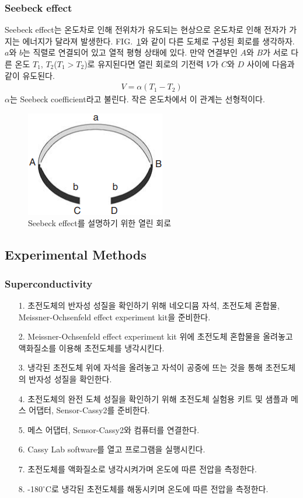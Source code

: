 \documentclass[aps,reprint,superscriptaddress,10pt]{revtex4-2}
\begin{document}
\subsubsection{Seebeck effect}
Seebeck effect는 온도차로 인해 전위차가 유도되는 현상으로 온도차로 인해 전자가 가지는
에너지가 달라져 발생한다. FIG.~\ref{fig:see}와 같이 다른 도체로 구성된 회로를 생각하자.
$a$와 $b$는 직렬로 연결되어 있고 열적 평형 상태에 있다. 만약 연결부인 $A$와 $B$가 서로
다른 온도 $T_1$, $T_2$($T_1>T_2$)로 유지된다면 열린 회로의 기전력 $V$가 $C$와 $D$ 사이에 다음과
같이 유도된다.
\begin{align}
  V = \alpha(T_1-T_2)
\end{align}
$\alpha$는 Seebeck coefficient라고 불린다. 작은 온도차에서 이 관계는 선형적이다.
\begin{figure}[htbp]
  \centering
  \includegraphics[scale = 0.6]{seebeck.png}
  \caption{Seebeck effect를 설명하기 위한 열린 회로}
  \label{fig:see}
\end{figure}








\subsection{Experimental Methods}
\subsubsection{Superconductivity}
\begin{itemize}
  \item[1. ] 초전도체의 반자성 성질을 확인하기 위해 네오디뮴 자석, 초전도체 혼합물, 
  Meissner-Ochsenfeld effect experiment kit을 준비한다.
  \item[2. ]
  Meissner-Ochsenfeld effect experiment kit 위에 초전도체 혼합물을 올려놓고 
  액화질소를 이용해 초전도체를 냉각시킨다.
  \item[3. ]
  냉각된 초전도체 위에 자석을 올려놓고 자석이 공중에 뜨는 것을 통해 초전도체의 반자성
  성질을 확인한다.
  \item[4. ] 초전도체의 완전 도체 성질을 확인하기 위해 초전도체 실험용 키트 및 샘플과
  메스 어댑터, Sensor-Cassy2를 준비한다.
  \item[5. ] 메스 어댑터, Sensor-Cassy2와 컴퓨터를 연결한다. 
  \item[6. ] Cassy Lab software를 열고 프로그램을 실행시킨다.
  \item[7. ] 초전도체를 액화질소로 냉각시켜가며 온도에 따른 전압을 측정한다.
  \item[8. ] -180$^\circ$C로 냉각된 초전도체를 해동시키며 온도에 따른 전압을 측정한다.  
\end{itemize}
\end{document}
